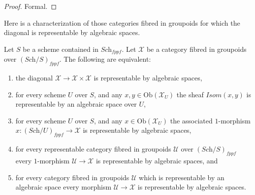 \begin{proof}
Formal.
\end{proof}

\noindent
Here is a characterization of those categories fibred in groupoids
for which the diagonal is representable by algebraic spaces.

\begin{lemma}
\label{lemma-representable-diagonal}
Let $S$ be a scheme contained in $\textit{Sch}_{fppf}$.
Let $\mathcal{X}$ be a category fibred in groupoids over
$(\textit{Sch}/S)_{fppf}$. The following are equivalent:
\begin{enumerate}
\item the diagonal $\mathcal{X} \to \mathcal{X} \times \mathcal{X}$
is representable by algebraic spaces,
\item for every scheme $U$ over $S$, and any
$x, y \in \text{Ob}(\mathcal{X}_U)$ the sheaf
$\mathit{Isom}(x, y)$ is representable by an algebraic space over $U$,
\item for every scheme $U$ over $S$, and any $x \in \text{Ob}(\mathcal{X}_U)$
the associated $1$-morphism $x : (\textit{Sch}/U)_{fppf} \to \mathcal{X}$
is representable by algebraic spaces,
\item for every representable category fibred in groupoids $\mathcal{U}$
over $(\textit{Sch}/S)_{fppf}$ every $1$-morphism $\mathcal{U} \to \mathcal{X}$
is representable by algebraic spaces, and
\item for every category fibred in groupoids $\mathcal{U}$ which is
representable by an algebraic space every morphism
$\mathcal{U} \to \mathcal{X}$ is representable by algebraic spaces.
\end{enumerate}
\end{lemma}

